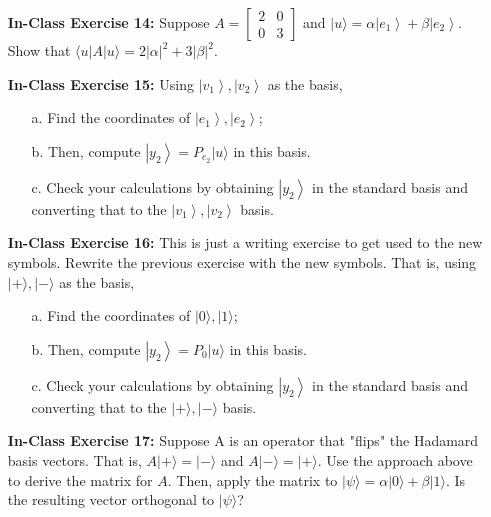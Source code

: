 \documentclass[main.tex]{subfiles}
\begin{document}
\begin{enumerate}
\item[] \textbf{In-Class Exercise 14:} Suppose $A=\left[\begin{array}{ll}2 & 0 \\ 0 & 3\end{array}\right]$ and $|u\rangle=\alpha\left|e_{1}\right\rangle+\beta\left|e_{2}\right\rangle$. Show that $\langle u|A| u\rangle=2|\alpha|^{2}+3|\beta|^{2}$.

\item[] \textbf{In-Class Exercise 15:} Using $\left|v_{1}\right\rangle,\left|v_{2}\right\rangle$ as the basis, 

    \begin{enumerate}
        \item[a.] Find the coordinates of $\left|e_{1}\right\rangle,\left|e_{2}\right\rangle$;
        \item[b.] Then, compute $\left|y_{2}\right\rangle=P_{e_{2}}|u\rangle$ in this basis.
        \item[c.] Check your calculations by obtaining $\left|y_{2}\right\rangle$ in the standard basis and converting that to the $\left|v_{1}\right\rangle,\left|v_{2}\right\rangle$ basis.
    \end{enumerate}

\item[] \textbf{In-Class Exercise 16:} This is just a writing exercise to get used to the new symbols. Rewrite the previous exercise with the new symbols. That is, using $|+\rangle,|-\rangle$ as the basis, 

    \begin{enumerate}
    \item[a.] Find the coordinates of $|0\rangle,|1\rangle$;
    \item[b.] Then, compute $\left|y_{2}\right\rangle=P_{0}|u\rangle$ in this basis.
    \item[c.] Check your calculations by obtaining $\left|y_{2}\right\rangle$ in the standard basis and converting that to the $|+\rangle,|-\rangle$ basis.
    \end{enumerate}

\item[] \textbf{In-Class Exercise 17:} Suppose A is an operator that "flips" the Hadamard basis vectors. That is, $A|+\rangle=|-\rangle$ and $A|-\rangle=|+\rangle$. Use the approach above to derive the matrix for $A$. Then, apply the matrix to $|\psi\rangle=\alpha|0\rangle+\beta|1\rangle$. Is the resulting vector orthogonal to $|\psi\rangle$?


\end{enumerate}
\end{document}

